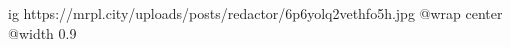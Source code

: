  
 
 
 
 

\ifcmt
  ig https://mrpl.city/uploads/posts/redactor/6p6yolq2vethfo5h.jpg
  @wrap center
  @width 0.9
\fi
